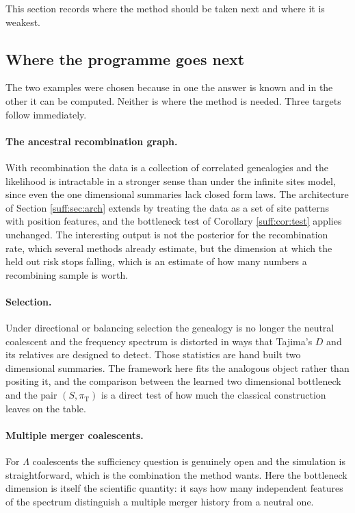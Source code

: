 This section records where the method should be taken next and where it is weakest.

\subsection{Where the programme goes next}

The two examples were chosen because in one the answer is known and in the other it can be
computed. Neither is where the method is needed. Three targets follow immediately.

\paragraph{The ancestral recombination graph.} With recombination the data is a collection of
correlated genealogies and the likelihood is intractable in a stronger sense than under the
infinite sites model, since even the one dimensional summaries lack closed form laws. The
architecture of Section \ref{suff:sec:arch} extends by treating the data as a set of site
patterns with position features, and the bottleneck test of Corollary \ref{suff:cor:test}
applies unchanged. The interesting output is not the posterior for the recombination rate,
which several methods already estimate, but the dimension at which the held out risk stops
falling, which is an estimate of how many numbers a recombining sample is worth.

\paragraph{Selection.} Under directional or balancing selection the genealogy is no longer the
neutral coalescent and the frequency spectrum is distorted in ways that Tajima's $D$ and its
relatives are designed to detect. Those statistics are hand built two dimensional summaries.
The framework here fits the analogous object rather than positing it, and the comparison
between the learned two dimensional bottleneck and the pair $(S,\pi_{\mathrm{T}})$ is a direct
test of how much the classical construction leaves on the table.

\paragraph{Multiple merger coalescents.} For $\Lambda$ coalescents the sufficiency question is
genuinely open and the simulation is straightforward, which is the combination the method
wants. Here the bottleneck dimension is itself the scientific quantity: it says how many
independent features of the spectrum distinguish a multiple merger history from a neutral
one.

